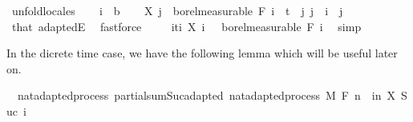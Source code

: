 \begin{isabellebody}
%
\isadelimproof
%
\endisadelimproof
%
\isatagproof
{}\isamarkupfalse%
\ {\isacharparenleft}{\kern0pt}unfold{\isacharunderscore}{\kern0pt}locales{\isacharparenright}{\kern0pt}\isanewline
\ \ \isamarkupfalse%
\ i\ {\isacharcolon}{\kern0pt}{\isacharcolon}{\kern0pt}\ {\isacharprime}{\kern0pt}b\isanewline
\ \ \isamarkupfalse%
\ {\isachardoublequoteopen}X\ j\ {\isasymin}\ borel{\isacharunderscore}{\kern0pt}measurable\ {\isacharparenleft}{\kern0pt}F\ i{\isacharparenright}{\kern0pt}{\isachardoublequoteclose}\ \ {\isachardoublequoteopen}t\ {\isasymle}\ j{\isachardoublequoteclose}\ {\isachardoublequoteopen}j\ {\isacharless}{\kern0pt}\ i{\isachardoublequoteclose}\ \ j\ \isamarkupfalse%
\ that\ adaptedE\ \isamarkupfalse%
\ fastforce\isanewline
\ \ \isamarkupfalse%
\ {\isachardoublequoteopen}{\isacharparenleft}{\kern0pt}{\isasymlambda}{\isasymxi}{\isachardot}{\kern0pt}\ {\isasymSum}i{\isasymin}{\isacharbraceleft}{\kern0pt}ti{\isacharbraceright}{\kern0pt}{\isachardot}{\kern0pt}\ X\ i\ {\isasymxi}{\isacharparenright}{\kern0pt}\ {\isasymin}\ borel{\isacharunderscore}{\kern0pt}measurable\ {\isacharparenleft}{\kern0pt}F\ i{\isacharparenright}{\kern0pt}{\isachardoublequoteclose}\ \isamarkupfalse%
\ simp\isanewline
{}\isamarkupfalse%
%
\endisatagproof
{\isafoldproof}%
%
\isadelimproof
\isanewline
%
\endisadelimproof
\isanewline
{}\isamarkupfalse%
%
\begin{isamarkuptext}%
In the dicrete time case, we have the following lemma which will be useful later on.%
\end{isamarkuptext}\isamarkuptrue%
\isamarkupfalse%
\ {\isacharparenleft}{\kern0pt}\ nat{\isacharunderscore}{\kern0pt}adapted{\isacharunderscore}{\kern0pt}process{\isacharparenright}{\kern0pt}\ partial{\isacharunderscore}{\kern0pt}sum{\isacharunderscore}{\kern0pt}Suc{\isacharunderscore}{\kern0pt}adapted{\isacharcolon}{\kern0pt}\ {\isachardoublequoteopen}nat{\isacharunderscore}{\kern0pt}adapted{\isacharunderscore}{\kern0pt}process\ M\ F\ {\isacharparenleft}{\kern0pt}{\isasymlambda}n\ {\isasymxi}{\isachardot}{\kern0pt}\ {\isasymSum}i{\isacharless}{\kern0pt}n{\isachardot}{\kern0pt}\ X\ {\isacharparenleft}{\kern0pt}Suc\ i{\isacharparenright}{\kern0pt}\ {\isasymxi}{\isacharparenright}{\kern0pt}{\isachardoublequoteclose}\ \isanewline

\end{isabellebody}

